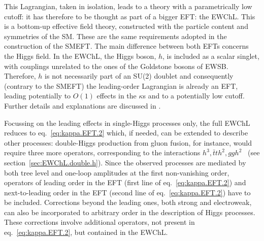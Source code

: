 This Lagrangian, taken in isolation, leads to a theory with a parametrically low cutoff: it has therefore to be thought as part of a bigger EFT: the EWChL\cite{Dobado:1989ax,Dobado:1989ue,Dobado:1990zh,Dobado:1990jy,Espriu:1991vm,Herrero:1993nc,Herrero:1994iu,Feruglio:1992wf,Bagger:1993zf,Koulovassilopoulos:1993pw,Burgess:1999ha,Wang:2006im,Grinstein:2007iv,Azatov:2012bz,Alonso:2012px,Buchalla:2012qq,Buchalla:2013rka,Buchalla:2013eza}. This is a bottom-up effective field theory, constructed with the particle content and symmetries of the SM. These are the same requirements adopted in the construction of the SMEFT. The main difference between both EFTs concerns the Higgs field. In the EWChL, the Higgs boson, $h$, is included as a scalar singlet, with couplings unrelated to the ones of the Goldstone bosons of EWSB. 
Therefore, $h$ is not necessarily part of an SU(2) doublet and consequently (contrary to the SMEFT) the leading-order Lagrangian is already an EFT, leading potentially to $O(1)$ effects in the $\kappa$s and to a potentially low cutoff.
Further details and explanations  are discussed in \cite{Guo:2015isa,Buchalla:2017jlu,Alonso:2017tdy,Buchalla:2013rka,Buchalla:2013eza,Buchalla:2015wfa,Buchalla:2016sop}.

Focussing on the leading effects in single-Higgs processes only, the full EWChL reduces to eq.~\eqref{eq:kappa.EFT.2} which, if needed,  can be extended to describe other processes:   double-Higgs production from gluon fusion, for instance, would require three more operators, corresponding to the interactions $h^{3},\bar{t}th^{2},ggh^{2}$~\cite{Grober:2015cwa,deFlorian:2016spz,Kim:2018uty,Buchalla:2018yce} (see section~\ref{sec:EWChL.double.h}). Since the observed processes are mediated by both tree level and one-loop amplitudes at the first non-vanishing order, operators of leading order in the EFT (first line of eq.~\eqref{eq:kappa.EFT.2}) and next-to-leading order in the EFT (second line of eq.~\eqref{eq:kappa.EFT.2}) have to be included\cite{Buchalla:2015wfa}. Corrections beyond the leading ones, both strong and electroweak, can also be incorporated to arbitrary order in the description of Higgs processes. These corrections involve additional operators, not present in eq.~\eqref{eq:kappa.EFT.2}, but contained in the EWChL.
 
